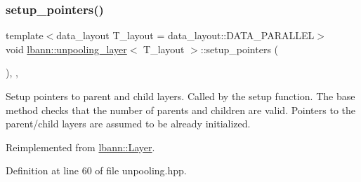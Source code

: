 \subsubsection{\texorpdfstring{setup\+\_\+pointers()}{setup\_pointers()}}
{\footnotesize\ttfamily template$<$data\+\_\+layout T\+\_\+layout = data\+\_\+layout\+::\+D\+A\+T\+A\+\_\+\+P\+A\+R\+A\+L\+L\+EL$>$ \\
void \hyperlink{classlbann_1_1unpooling__layer}{lbann\+::unpooling\+\_\+layer}$<$ T\+\_\+layout $>$\+::setup\+\_\+pointers (\begin{DoxyParamCaption}{ }\end{DoxyParamCaption})\hspace{0.3cm}{\ttfamily [inline]}, {\ttfamily [override]}, {\ttfamily [virtual]}}

Setup pointers to parent and child layers. Called by the setup function. The base method checks that the number of parents and children are valid. Pointers to the parent/child layers are assumed to be already initialized. 

Reimplemented from \hyperlink{classlbann_1_1Layer_a71b7a62afd9b73c23b2c0267b8ba0981}{lbann\+::\+Layer}.



Definition at line 60 of file unpooling.\+hpp.


